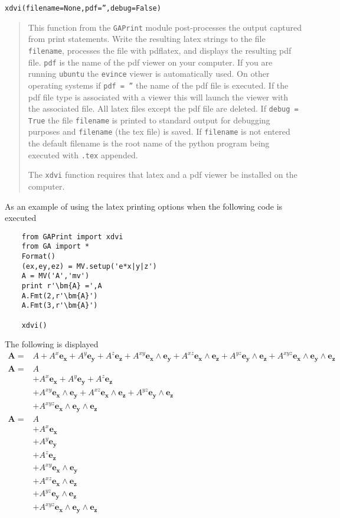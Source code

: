 \documentclass[10pt]{article}
\newcommand{\W}{\wedge}
\newcommand{\T}[1]{\texttt{#1}}
\begin{document}
\T{xdvi(filename=None,pdf='',debug=False)}
\begin{quote}
   This function from the \T{GAPrint} module post-processes the output captured from
   print statements.  Write the resulting latex strings to the file \T{filename},
   processes the file with pdflatex, and displays the resulting pdf file. \T{pdf} is the name of the
   pdf viewer on your computer.  If you are running \T{ubuntu} the \T{evince} viewer is automatically
   used.  On other operating systems if \T{pdf = ''} the name of the pdf file is executed.  If the
   pdf file type is associated with a viewer this will launch the viewer with the associated file.
   All latex files except
   the pdf file are deleted. If \T{debug = True} the file \T{filename} is printed to
   standard output for debugging purposes and \T{filename} (the tex file) is saved.  If \T{filename} is not entered the default
   filename is the root name of the python program being executed with \T{.tex} appended.

   The \T{xdvi} function requires that latex and a pdf viewer be installed on
   the computer.
\end{quote}

As an example of using the latex printing options when the following code is
executed

\begin{lstlisting}
    from GAPrint import xdvi
    from GA import *
    Format()
    (ex,ey,ez) = MV.setup('e*x|y|z')
    A = MV('A','mv')
    print r'\bm{A} =',A
    A.Fmt(2,r'\bm{A}')
    A.Fmt(3,r'\bm{A}')

    xdvi()
\end{lstlisting}

The following is displayed
\begin{align}
      \bm{A} = & A+A^{x}\bm{e_{x}}+A^{y}\bm{e_{y}}+A^{z}\bm{e_{z}}+A^{xy}\bm{e_{x}\W e_{y}}+A^{xz}\bm{e_{x}\W e_{z}}+A^{yz}\bm{e_{y}\W e_{z}}+A^{xyz}\bm{e_{x}\W e_{y}\W e_{z}} \\
      \bm{A} =  & A \\  & +A^{x}\bm{e_{x}}+A^{y}\bm{e_{y}}+A^{z}\bm{e_{z}} \\  & +A^{xy}\bm{e_{x}\W e_{y}}+A^{xz}\bm{e_{x}\W e_{z}}+A^{yz}\bm{e_{y}\W e_{z}} \\  & +A^{xyz}\bm{e_{x}\W e_{y}\W e_{z}} \\
      \bm{A} =  & A \\  & +A^{x}\bm{e_{x}} \\  & +A^{y}\bm{e_{y}} \\  & +A^{z}\bm{e_{z}} \\  & +A^{xy}\bm{e_{x}\W e_{y}} \\  & +A^{xz}\bm{e_{x}\W e_{z}} \\  & +A^{yz}\bm{e_{y}\W e_{z}} \\  & +A^{xyz}\bm{e_{x}\W e_{y}\W e_{z}}
\end{align}
\end{document}
